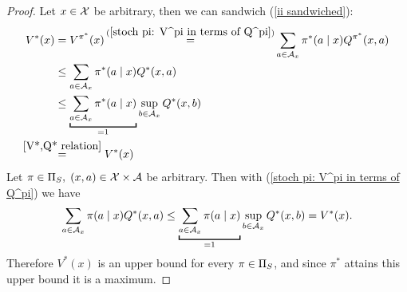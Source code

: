 \begin{proof}
	\xToy{\ref{ii:1}}{\ref{ii:2}} Let \(x\in\mathcal{X}\) be arbitrary, then we can sandwich (\ref{ii sandwiched}):
	\begin{align}
		V^*(x)&=V^{\pi^*}(x)\xeq{(\ref{stoch pi: V^pi in terms of Q^pi})}
		\sum_{a\in\cA_x}\pi^*(a\mid x) Q^{\pi^*}(x,a) \nonumber\\
		&\le \sum_{a\in\cA_x}\pi^*(a\mid x) Q^*(x,a)\label{ii sandwiched} \\
		&\le \underbracket[1pt]{\sum_{a\in\cA_x}\pi^*(a\mid x)}_{=1} 
		\sup_{b\in\cA_x}Q^*(x,b) \nonumber\\
		&\lxeq{\ref{V*,Q* relation}}V^*(x) \nonumber
	\end{align}
	\xToy{\ref{ii:2}}{\ref{ii:3}} Let \(\pi\in\Pi_S,\; (x,a)\in\mathcal{X}\times\mathcal{A}\) be arbitrary. Then with (\ref{stoch pi: V^pi in terms of Q^pi}) we have
	\[
		\sum_{a\in\cA_x}\pi(a\mid x) Q^*(x,a)
		\le \underbracket[1pt]{\sum_{a\in\cA_x}\pi(a\mid x)}_{=1}
		\sup_{b\in\cA_x}Q^*(x,b)=V^*(x).
	\]
	Therefore \(V^* (x)\) is an upper bound for every \(\pi\in\Pi_S\), and since \(\pi^*\) attains this upper bound it is a maximum.


\end{proof}
